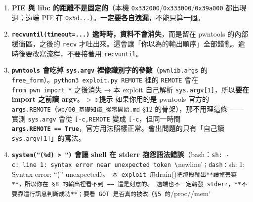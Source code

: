 \documentclass[10pt,a4paper]{article}
\begin{document}
\begin{enumerate}
  沒關係（stripped），可以搜尋 \texttt{call\ \allowbreak{}rax} 後面接
  \texttt{mov\ \allowbreak{}edi,\allowbreak{}eax;\ \allowbreak{}call\ \allowbreak{}exit} 的樣式。
\item
  \textbf{PIE 與 libc 的距離不是固定的}（本機
  \texttt{0x332000}/\texttt{0x333000}/\texttt{0x39a000} 都出現過；遠端
  PIE 在 \texttt{0x5d...}）。\textbf{一定要各自洩漏}，不能只算一個。
\item
  \textbf{\texttt{recvuntil(timeout=...)}
  逾時時，資料不會消失}，而是留在 pwntools 的內部緩衝區，之後的
  \texttt{recv}
  才吐出來。這會讓「你以為的輸出順序」全部錯亂。逾時後要改寫流程，不要接著用
  \texttt{recvuntil}。
\item
  \textbf{\texttt{pwntools} 會吃掉 \texttt{sys.\allowbreak{}argv}
  裡像識別字的參數}（\texttt{pwnlib.\allowbreak{}args} 的
  \texttt{free\_\allowbreak{}form}）。\texttt{python3\ \allowbreak{}exploit.\allowbreak{}py\ \allowbreak{}REMOTE} 裡的
  \texttt{REMOTE} 會在 \texttt{from\ \allowbreak{}pwn\ \allowbreak{}import\ \allowbreak{}*} 之後消失 → 本
  exploit 自己解析 \texttt{sys.\allowbreak{}argv{[}1{]}}，所以\textbf{要在 import
  之前讀 argv}。 \textgreater{} ※提示 如果你用的是 pwntools 官方的
  \texttt{args.\allowbreak{}REMOTE}（\texttt{wp/\allowbreak{}00\_\allowbreak{}基礎知識\_\allowbreak{}從零開始.\allowbreak{}md} §12
  的骨架），那不用理這條 ------ 實測 \texttt{sys.\allowbreak{}argv} 會從
  \texttt{{[}\textquotesingle{}\allowbreak{}-\allowbreak{}c\textquotesingle{}\allowbreak{},\allowbreak{}\textquotesingle{}\allowbreak{}REMOTE\textquotesingle{}\allowbreak{}{]}}
  變成 \texttt{{[}\textquotesingle{}\allowbreak{}-\allowbreak{}c\textquotesingle{}\allowbreak{}{]}}，但同一時間
  \textbf{\texttt{args.\allowbreak{}REMOTE\ \allowbreak{}==\ \allowbreak{}True}}，官方用法照樣正常。會出問題的只有「自己讀
  \texttt{sys.\allowbreak{}argv{[}1{]}}」的寫法。
\item
  \textbf{\texttt{system("(\%\allowbreak{}d)\ \allowbreak{}\textgreater{}\allowbreak{}\ \allowbreak{}")} 會讓 shell 在
  stderr
  抱怨語法錯誤}（bash：\texttt{sh:\allowbreak{}\ \allowbreak{}-\allowbreak{}c:\allowbreak{}\ \allowbreak{}line\ \allowbreak{}1:\allowbreak{}\ \allowbreak{}syntax\ \allowbreak{}error\ \allowbreak{}near\ \allowbreak{}unexpected\ \allowbreak{}token\ \allowbreak{}\textbackslash{}\allowbreak{}}newline'\texttt{；dash：}sh:
  1: Syntax error: ``(''
  unexpected\texttt{）。\ \allowbreak{}本\ \allowbreak{}exploit\ \allowbreak{}用}drain()\texttt{把那段輸出**讀掉丟棄**，所以你在\ \allowbreak{}§8\ \allowbreak{}的輸出裡看不到\ \allowbreak{}——\ \allowbreak{}這是刻意的。\ \allowbreak{}遠端也不一定轉發\ \allowbreak{}stderr，**不要靠這行訊息判斷成功**；要看\ \allowbreak{}GOT\ \allowbreak{}是否真的被改（§5\ \allowbreak{}的}/proc//mem`

\end{enumerate}
\end{document}

